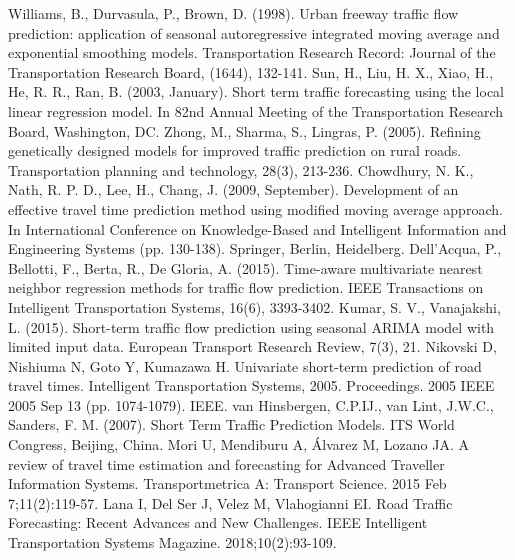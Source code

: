 \documentclass[conference, letterpaper]{IEEEtran}
\begin{document}
\begin{thebibliography}{00}
 Williams, B., Durvasula, P., Brown, D. (1998). Urban freeway traffic flow prediction: application of seasonal autoregressive integrated moving average and exponential smoothing models. Transportation Research Record: Journal of the Transportation Research Board, (1644), 132-141.
 Sun, H., Liu, H. X., Xiao, H., He, R. R., Ran, B. (2003, January). Short term traffic forecasting using the local linear regression model. In 82nd Annual Meeting of the Transportation Research Board, Washington, DC.
 Zhong, M., Sharma, S., Lingras, P. (2005). Refining genetically designed models for improved traffic prediction on rural roads. Transportation planning and technology, 28(3), 213-236.
 Chowdhury, N. K., Nath, R. P. D., Lee, H., Chang, J. (2009, September). Development of an effective travel time prediction method using modified moving average approach. In International Conference on Knowledge-Based and Intelligent Information and Engineering Systems (pp. 130-138). Springer, Berlin, Heidelberg.
 Dell'Acqua, P., Bellotti, F., Berta, R., De Gloria, A. (2015). Time-aware multivariate nearest neighbor regression methods for traffic flow prediction. IEEE Transactions on Intelligent Transportation Systems, 16(6), 3393-3402.
 Kumar, S. V., Vanajakshi, L. (2015). Short-term traffic flow prediction using seasonal ARIMA model with limited input data. European Transport Research Review, 7(3), 21.
 Nikovski D, Nishiuma N, Goto Y, Kumazawa H. Univariate short-term prediction of road travel times. Intelligent Transportation Systems, 2005. Proceedings. 2005 IEEE 2005 Sep 13 (pp. 1074-1079). IEEE.
 van Hinsbergen, C.P.IJ., van Lint, J.W.C.,  Sanders, F. M. (2007). Short Term Traffic Prediction Models. ITS World Congress, Beijing, China.
 Mori U, Mendiburu A, Álvarez M, Lozano JA. A review of travel time estimation and forecasting for Advanced Traveller Information Systems. Transportmetrica A: Transport Science. 2015 Feb 7;11(2):119-57.
 Lana I, Del Ser J, Velez M, Vlahogianni EI. Road Traffic Forecasting: Recent Advances and New Challenges. IEEE Intelligent Transportation Systems Magazine. 2018;10(2):93-109.
\end{thebibliography}
\end{document}
